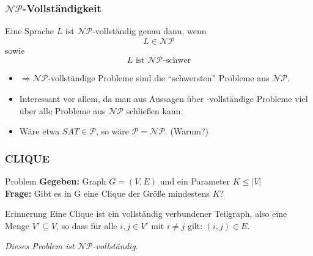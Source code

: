\begin{frame}
\frametitle{$\mathcal{NP}$-Vollständigkeit}
Eine Sprache $L$ ist $\mathcal{NP}$-vollständig genau dann, wenn
$$L \in \mathcal{NP}$$ sowie $$L\mbox{ ist $\mathcal{NP}$-schwer}$$

\begin{itemize}
	\item $\Rightarrow \mathcal{NP}$-vollständige Probleme sind die "`schwersten"' Probleme aus $\mathcal{NP}$.\\
	\item Interessant vor allem, da man aus Aussagen über \classNP{}-vollständige Probleme viel über alle Probleme aus $\mathcal{NP}$ schließen kann.
	\item Wäre etwa $SAT \in \mathcal{P}$, so wäre $\mathcal{P} = \mathcal{NP}$. (Warum?)
\end{itemize}

\end{frame}

\begin{frame}
\frametitle{CLIQUE}
\begin{block}{Problem}
\textbf{Gegeben:} Graph $G = (V, E)$ und ein Parameter $K \leq |V|$\\
\textbf{Frage:} Gibt es in G eine Clique der Größe mindestens $K$?
\end{block}
\begin{block}{Erinnerung}
Eine Clique ist ein vollständig verbundener Teilgraph, also eine Menge $V' \subseteq V$, so dass für alle $i,j \in V'$ mit $i\neq j$ gilt: $(i, j) \in E$.
\end{block}
\textit{Dieses Problem ist $\mathcal{NP}$-vollständig.}
\end{frame}

